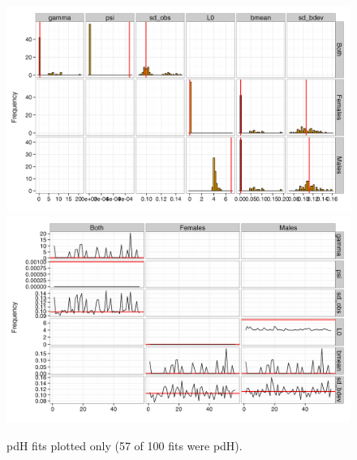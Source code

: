 \documentclass[11pt, a4paper]{article}
\begin{document}
\begin{figure}[!htbp]
  \centering
  \includegraphics[width=\linewidth]{../simulation/sims2/results/SimPars.png}
  \includegraphics[width=\linewidth]{../simulation/sims2/results/TracePars.png}
  \begin{quote}
    \caption{pdH fits plotted only (57 of 100 fits were pdH).}
    \label{fig:sims2}
  \end{quote}
\end{figure}
\end{document}
